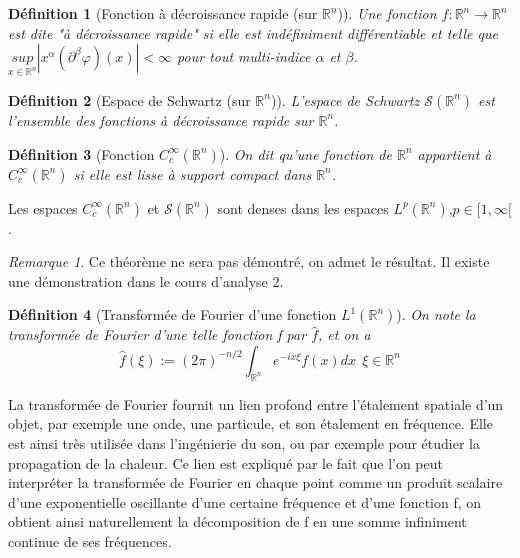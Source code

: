 \documentclass[a4paper, 12pt]{report}
\newcommand{\R}{\mathbb{R}} %
\renewcommand{\.}{\cdot} %
\theoremstyle{break}
\newtheorem{definition}{Définition}
\theoremstyle{remark}
\newtheorem{remark}{Remarque}
\theoremstyle{proofstyle}
\begin{document}
\begin{definition}[Fonction à décroissance rapide (sur $\mathbb{R}^n$)]
    Une fonction $f : \mathbb{R}^n \rightarrow \mathbb{R}^n$ est dite "à décroissance rapide" si elle est indéfiniment différentiable et telle que $ \underset{x \in \mathbb{R}^n}{sup} |x^\alpha (\partial ^\beta \varphi)(x)| < \infty$ pour tout multi-indice $\alpha$ et $\beta$.
\end{definition}

\begin{definition}[Espace de Schwartz (sur $\mathbb{R}^n$)]
    L'espace de Schwartz $\mathcal{S}(\mathbb{R}^n)$ est l'ensemble des fonctions à décroissance rapide sur $\mathbb{R}^n$.
\end{definition}

\begin{definition}[Fonction $C_c^\infty(\R^n)$]
    On dit qu'une fonction de $\R^n$ appartient à $C_c^\infty(\R^n)$ si elle est lisse à support compact dans $\R^n$.
\end{definition}

\begin{theorem}
    Les espaces $C_c^\infty(\R^n)$ et $\mathcal{S}(\R^n)$ sont denses dans les espaces $L^p(\R^n)$,$ p \in [1, \infty [$.
\end{theorem}

\begin{remark}
    Ce théorème ne sera pas démontré, on admet le résultat. Il existe une démonstration dans le cours d'analyse 2.
\end{remark}

\begin{definition}[Transformée de Fourier d'une fonction $L^1(\mathbb{R}^n)$]
    On note la transformée de Fourier d'une telle fonction f par $\hat{f}$, et on a
    $$\hat{f}(\xi) := (2 \pi)^{-n/2} \int _{\mathbb{R}^n} e^{-ix \xi} f(x) dx ~~ \xi \in \mathbb{R}^n$$
\end{definition}

La transformée de Fourier fournit un lien profond entre l'étalement spatiale d'un objet, par exemple une onde, une particule, et son étalement en fréquence. Elle est ainsi très utilisée dans l'ingénierie du son, ou par exemple pour étudier la propagation de la chaleur. Ce lien est expliqué par le fait que l'on peut interpréter la transformée de Fourier en chaque point comme un produit scalaire d'une exponentielle oscillante d'une certaine fréquence et d'une fonction f, on obtient ainsi naturellement la décomposition de f en une somme infiniment continue de ses fréquences.
\end{document}
